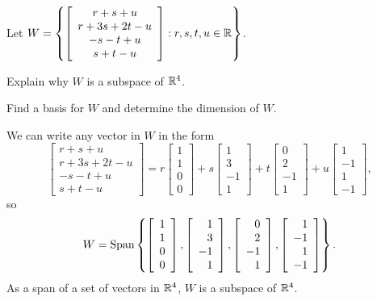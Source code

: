 \begin{example} Let $W = \left\{ \left[ \begin{array}{c} r+s+u \\ r+3s+2t-u\\ -s-t+u \\ s+t-u  \end{array} \right] : r,s,t,u \in \mathbb{R} \right\}$.  
\ba
\item Explain why $W$ is a subspace of $\mathbb{R}^4$. 

\item Find a basis for $W$ and determine the dimension of $W$. 

\ea

\ExampleSolution
\ba
\item We can write any vector in $W$ in the form
\[\left[ \begin{array}{c} r+s+u \\ r+3s+2t-u\\ -s-t+u \\ s+t-u  \end{array} \right] = r\left[ \begin{array}{c} 1 \\ 1 \\ 0 \\ 0\end{array} \right] + s\left[ \begin{array}{r} 1 \\ 3\\ -1 \\ 1 \end{array} \right] + t\left[ \begin{array}{r} 0 \\ 2 \\ -1 \\ 1 \end{array} \right] + u\left[ \begin{array}{r} 1 \\ -1 \\ 1 \\ -1 \end{array} \right],\]
so 
\[W = \text{Span}\left\{ \left[ \begin{array}{c} 1 \\ 1 \\ 0 \\ 0\end{array} \right], \left[ \begin{array}{r} 1 \\ 3\\ -1 \\ 1 \end{array} \right] , \left[ \begin{array}{r} 0 \\ 2 \\ -1 \\ 1 \end{array} \right], \left[ \begin{array}{r} 1 \\ -1 \\ 1 \\ -1 \end{array} \right]\right\}.\]
As a span of a set of vectors in $\mathbb{R}^4$, $W$ is a subspace of $\mathbb{R}^4$. 


\end{example}
